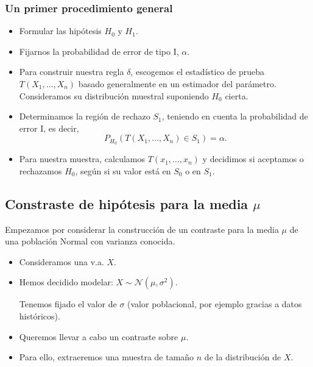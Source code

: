\subsubsection{Un primer procedimiento general}
\begin{tcolorbox}[colback=blue!5!white, colframe=blue!75!black, title=\textbf{Para llevar a cabo un contraste de hipótesis, podemos}]
\begin{itemize}[label=\textbullet]
    \item Formular las hipótesis $H_0$ y $H_1$.
    \item Fijarnos la probabilidad de error de tipo I, $\alpha$.
    \item Para construir nuestra regla $\delta$, escogemos el estadístico de prueba  $T(X_1,\dots,X_n)$ basado generalmente en un estimador del parámetro. Consideramos su distribución muestral suponiendo $H_0$ cierta.
    \item Determinamos la región de rechazo $S_1$, teniendo en cuenta la probabilidad de error I, es decir, \[
    P_{H_0}(T(X_1,\dots,X_n)\in S_1)=\alpha.
    \] 
\item Para nuestra muestra, calculamos $T(x_1,\dots,x_n)$ y decidimos si aceptamos o rechazamos $H_0$, según si su valor está en $S_0$ o en $S_1$.
\end{itemize}
\end{tcolorbox}
\subsection{Constraste de hipótesis para la media $\mu$}
\begin{tcolorbox}[colback=olive!5!white, colframe=olive!75!black, title=\textbf{Primer caso}]
Empezamos por considerar la construcción de un contraste para la media $\mu$ de una población Normal con varianza conocida. 
\end{tcolorbox}
\begin{tcolorbox}[colback=blue!5!white, colframe=blue!75!black, title=\textbf{Contexto}]
\begin{itemize}[label=\textbullet]
    \item Consideramos una v.a. $X$.
    \item Hemos decidido modelar:  $X\sim \mathcal{N}(\mu,\sigma^2)$.

        Tenemos fijado el valor de $\sigma$ (valor poblacional, por ejemplo gracias a datos históricos).
    \item Queremos llevar a cabo un contraste sobre $\mu$.
    \item Para ello, extraeremos una muestra de tamaño $n$ de la distribución de $X$.
\end{itemize}
\end{tcolorbox}
